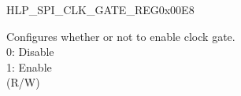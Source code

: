 \begin{register}{H}{LP\_SPI\_CLK\_GATE\_REG}{0x00E8}\label{regdesc:LPSPICLKGATEREG}
%
%
%
%
\regnewline%
\begin{regdesc}\begin{reglist}
\label{fielddesc:LPSPICLKEN}\item [LP\_SPI\_CLK\_EN] Configures whether or not to enable clock gate.\\
0: Disable\\
1: Enable\\
 (R/W)
\end{reglist}\end{regdesc}
\end{register}


